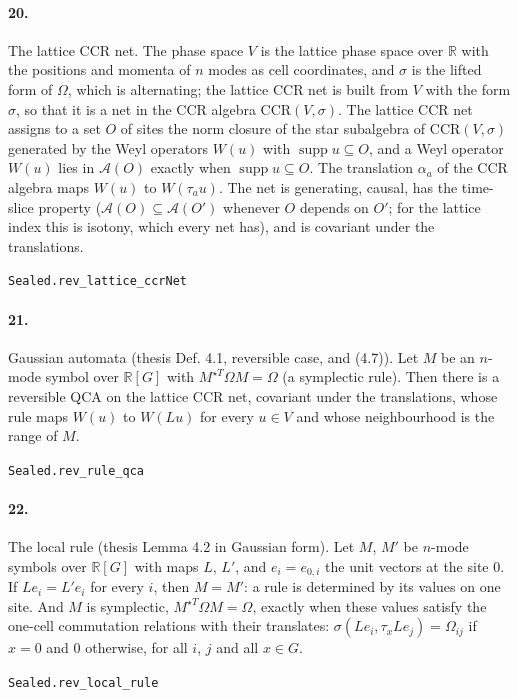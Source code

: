 \documentclass[11pt]{article}
\begin{document}
\paragraph{20.} The lattice CCR net. The phase space $V$ is the lattice phase space over $\mathbb R$ with the positions and momenta of $n$ modes as cell coordinates, and $\sigma$ is the lifted form of $\Omega$, which is alternating; the lattice CCR net is built from $V$ with the form $\sigma$, so that it is a net in the CCR algebra $\mathrm{CCR}(V, \sigma)$. The lattice CCR net assigns to a set $O$ of sites the norm closure of the star subalgebra of $\mathrm{CCR}(V, \sigma)$ generated by the Weyl operators $W(u)$ with $\operatorname{supp} u \subseteq O$, and a Weyl operator $W(u)$ lies in $\mathcal A(O)$ exactly when $\operatorname{supp} u \subseteq O$. The translation $\alpha_a$ of the CCR algebra maps $W(u)$ to $W(\tau_a u)$. The net is generating, causal, has the time-slice property ($\mathcal A(O) \subseteq \mathcal A(O')$ whenever $O$ depends on $O'$; for the lattice index this is isotony, which every net has), and is covariant under the translations.\par{\footnotesize\texttt{Sealed.rev\_lattice\_ccrNet}}

\paragraph{21.} Gaussian automata (thesis Def. 4.1, reversible case, and (4.7)). Let $M$ be an $n$-mode symbol over $\mathbb R[G]$ with $M^{\star T} \Omega M = \Omega$ (a symplectic rule). Then there is a reversible QCA on the lattice CCR net, covariant under the translations, whose rule maps $W(u)$ to $W(L u)$ for every $u \in V$ and whose neighbourhood is the range of $M$.\par{\footnotesize\texttt{Sealed.rev\_rule\_qca}}

\paragraph{22.} The local rule (thesis Lemma 4.2 in Gaussian form). Let $M$, $M'$ be $n$-mode symbols over $\mathbb R[G]$ with maps $L$, $L'$, and $e_i = e_{0,i}$ the unit vectors at the site $0$. If $L e_i = L' e_i$ for every $i$, then $M = M'$: a rule is determined by its values on one site. And $M$ is symplectic, $M^{\star T} \Omega M = \Omega$, exactly when these values satisfy the one-cell commutation relations with their translates: $\sigma(L e_i, \tau_x L e_j) = \Omega_{ij}$ if $x = 0$ and $0$ otherwise, for all $i$, $j$ and all $x \in G$.\par{\footnotesize\texttt{Sealed.rev\_local\_rule}}
\end{document}
